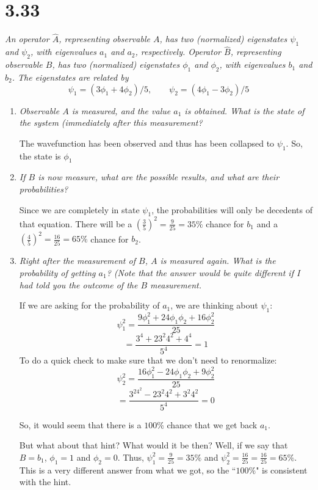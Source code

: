 \documentclass[12pt]{article}
\begin{document}
\newpage

\section*{3.33}
\emph{An operator $\hat{A}$, representing observable $A$, has two (normalized) eigenstates $\psi_1$ and $\psi_2$, with eigenvalues $a_1$ and $a_2$, respectively. Operator $\hat{B}$, representing observable $B$, has two (normalized) eigenstates $\phi_1$ and $\phi_2$, with eigenvalues $b_1$ and $b_2$. The eigenstates are related by}
\[\psi_1 = (3\phi_1 + 4\phi_2)/5, \qquad \psi_2 = (4\phi_1 - 3\phi_2)/5\]
\begin{enumerate}[label=\alph*)]
\item \emph{Observable $A$ is measured, and the value $a_1$ is obtained. What is the state of the system (immediately after this measurement?}\bigskip

The wavefunction has been observed and thus has been collapsed to $\psi_1$. So, the state is $\phi_1$

\item \emph{If $B$ is now measure, what are the possible results, and what are their probabilities?}\bigskip

Since we are completely in state $\psi_1$, the probabilities will only be decedents of that equation. There will be a $(\frac{3}{5})^2 = \frac{9}{25} = 35\%$ chance for $b_1$ and a   $(\frac{4}{5})^2 = \frac{16}{25} = 65\%$ chance for $b_2$.

\item \emph{Right after the measurement of $B$, $A$ is measured again. What is the probability of getting $a_1$? (Note that the answer would be quite different if I had told you the outcome of the $B$ measurement.}

If we are asking for the probability of $a_1$, we are thinking about $\psi_1$:
\[\psi_1^2 = \frac{9\phi_1^2 + 24\phi_1 \phi_2 + 16\phi_2^2}{25}\]
\[= \frac{3^4+ 23^2 4^2 + 4^4}{5^4} = 1\]
To do a quick check to make sure that we don't need to renormalize:
\[\psi_2^2 = \frac{16\phi_1^2 - 24\phi_1 \phi_2 + 9\phi_2^2}{25}\]
\[= \frac{3^24^2- 23^2 4^2 + 3^2 4^2}{5^4} = 0\]

So, it would seem that there is a $100\%$ chance that we get back $a_1$. 

But what about that hint? What would it be then? Well, if we say that $B=b_1$, $\phi_1 = 1$ and $\phi_2 = 0$. Thus, $\psi_1^2 = \frac{9}{25} = 35\%$ and $\psi_2^2 = \frac{16}{25} = \frac{16}{25} = 65\%$. This is a very different answer from what we got, so the ``$100\%$" is consistent with the hint. 
\end{enumerate}
\end{document}
